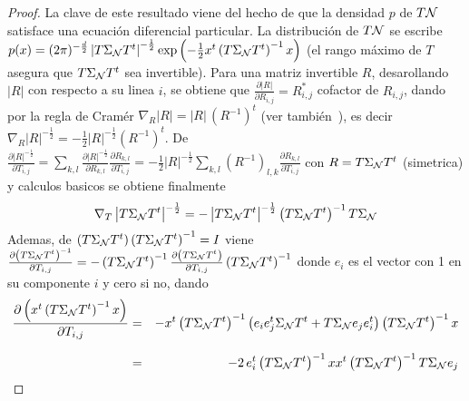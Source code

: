 \begin{proof}
  La  clave de  este resultado  viene del  hecho de  que la  densidad $p$  de $T
  \mathcal{N}$ satisface una ecuaci\'on diferencial particular.
  La  distribuci\'on de  $T \mathcal{N}$  se escribe  $p(x) =  (2 \pi)^{-\frac{d}{2}}
  \left| T \Sigma_{\mathcal{N}} T^t  \right|^{-\frac12} \exp\left( - \frac12 x^t \left(
      T  \Sigma_{\mathcal{N}} T^t  \right)^{-1} x  \right)$ (el  rango m\'aximo  de $T$
  asegura que $T \Sigma_{\mathcal{N}} T^t$ sea invertible).  Para una matriz invertible
  $R$,  desarollando  $|R|$  con  respecto  a  su  linea  $i$,  se  obtiene  que
  $\frac{\partial  |R|}{\partial R_{i,j}}  = R_{i,j}^*$  cofactor  de $R_{i,j}$,
  dando por la regla de Cram\'er $\nabla_R |R| = |R| \, \left( R^{-1} \right)^t$
  (ver     tambi\'en~\cite[cap.~1~\&~9]{MagNeu99}),    es     decir    $\nabla_R
  |R|^{-\frac12}  =  -\frac12   |R|^{-\frac12}  \left(  R^{-1}  \right)^t$.   De
  $\frac{\partial |R|^{-\frac12}}{\partial  T_{i,j}} = \sum_{k,l} \frac{\partial
    |R|^{-\frac12}}{\partial R_{k,l}}  \frac{\partial R_{k,l}}{\partial T_{i,j}}
  =   -\frac12    |R|^{-\frac12}   \sum_{k,l}   \left(    R^{-1}   \right)_{l,k}
  \frac{\partial  R_{k,l}}{\partial  T_{i,j}}$ con  $R  =  T \Sigma_{\mathcal{N}}  T^t$
  (simetrica)  y calculos  basicos  se obtiene  finalmente
  \[
  \nabla_T  \left|   T  \Sigma_{\mathcal{N}}  T^t  \right|^{-\frac12}  =   -  \left|  T
    \Sigma_{\mathcal{N}} T^t \right|^{-\frac12} \left( T \Sigma_{\mathcal{N}} T^t \right)^{-1}
  T \Sigma_{\mathcal{N}}
  \]
  Ademas,  de $\left(  T \Sigma_{\mathcal{N}}  T^t \right)  \left( T  \Sigma_{\mathcal{N}} T^t
  \right)^{-1}   =  I$   viene  $\frac{\partial   \left(  T   \Sigma_{\mathcal{N}}  T^t
    \right)^{-1}}{\partial T_{i,j}} = -  \left( T \Sigma_{\mathcal{N}} T^t \right)^{-1}
  \frac{\partial \left( T \Sigma_{\mathcal{N}}  T^t \right)}{\partial T_{i,j}} \left( T
    \Sigma_{\mathcal{N}}  T^t  \right)^{-1}$ donde  $e_i$  es el  vector  con  1 en  su
  componente $i$ y cero si no, dando
  \begin{eqnarray*}
  \frac{\partial \left( x^t \left( T \Sigma_{\mathcal{N}} T^t \right)^{-1} x
  \right)}{\partial T_{i,j}} & = & - x^t \left( T \Sigma_{\mathcal{N}} T^t \right)^{-1}
  \left( e_i e_j^t \Sigma_{\mathcal{N}} T^t + T \Sigma_{\mathcal{N}} e_j e_i^t \right) \left( T
  \Sigma_{\mathcal{N}} T^t \right)^{-1} x\\[2.5mm]
  & = & - 2 \, e_i^t \left( T \Sigma_{\mathcal{N}} T^t \right)^{-1} x x^t \left( T
  \Sigma_{\mathcal{N}} T^t \right)^{-1} T \Sigma_{\mathcal{N}} e_j
  \end{eqnarray*}

\end{proof}
